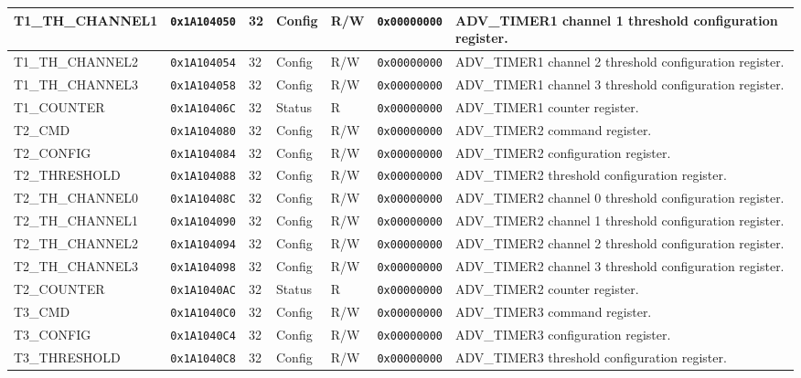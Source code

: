 {\begin{tabularx}{\textwidth}{|l|l|l|l|l|l|X|}
  \hline
  T1\_TH\_CHANNEL1 & \texttt{0x1A104050} & 32 & Config & R/W & \texttt{0x00000000} & ADV\_TIMER1 channel 1 threshold configuration register.\\
  \hline
  T1\_TH\_CHANNEL2 & \texttt{0x1A104054} & 32 & Config & R/W & \texttt{0x00000000} & ADV\_TIMER1 channel 2 threshold configuration register.\\
  \hline
  T1\_TH\_CHANNEL3 & \texttt{0x1A104058} & 32 & Config & R/W & \texttt{0x00000000} & ADV\_TIMER1 channel 3 threshold configuration register.\\
  \hline
  T1\_COUNTER & \texttt{0x1A10406C} & 32 & Status & R & \texttt{0x00000000} & ADV\_TIMER1 counter register.\\
  \hline
  T2\_CMD & \texttt{0x1A104080} & 32 & Config & R/W & \texttt{0x00000000} & ADV\_TIMER2 command register.\\
  \hline
  T2\_CONFIG & \texttt{0x1A104084} & 32 & Config & R/W & \texttt{0x00000000} & ADV\_TIMER2 configuration register.\\
  \hline
  T2\_THRESHOLD & \texttt{0x1A104088} & 32 & Config & R/W & \texttt{0x00000000} & ADV\_TIMER2 threshold configuration register.\\
  \hline
  T2\_TH\_CHANNEL0 & \texttt{0x1A10408C} & 32 & Config & R/W & \texttt{0x00000000} & ADV\_TIMER2 channel 0 threshold configuration register.\\
  \hline
  T2\_TH\_CHANNEL1 & \texttt{0x1A104090} & 32 & Config & R/W & \texttt{0x00000000} & ADV\_TIMER2 channel 1 threshold configuration register.\\
  \hline
  T2\_TH\_CHANNEL2 & \texttt{0x1A104094} & 32 & Config & R/W & \texttt{0x00000000} & ADV\_TIMER2 channel 2 threshold configuration register.\\
  \hline
  T2\_TH\_CHANNEL3 & \texttt{0x1A104098} & 32 & Config & R/W & \texttt{0x00000000} & ADV\_TIMER2 channel 3 threshold configuration register.\\
  \hline
  T2\_COUNTER & \texttt{0x1A1040AC} & 32 & Status & R & \texttt{0x00000000} & ADV\_TIMER2 counter register.\\
  \hline
  T3\_CMD & \texttt{0x1A1040C0} & 32 & Config & R/W & \texttt{0x00000000} & ADV\_TIMER3 command register.\\
  \hline
  T3\_CONFIG & \texttt{0x1A1040C4} & 32 & Config & R/W & \texttt{0x00000000} & ADV\_TIMER3 configuration register.\\
  \hline
  T3\_THRESHOLD & \texttt{0x1A1040C8} & 32 & Config & R/W & \texttt{0x00000000} & ADV\_TIMER3 threshold configuration register.\\

\end{tabularx}}
